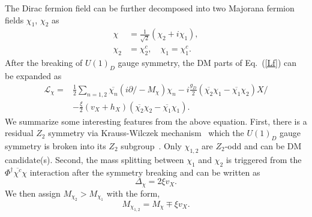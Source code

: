 \documentclass[preprint, superscriptaddress,amsmath, nofootinbib]{revtex4-1}
\begin{document}
{The Dirac fermion field can be further decomposed into two Majorana fermion fields $\chi_1$, $\chi_2$ as 
\begin{equation}
\begin{split} 
    \chi &= \frac{1}{\sqrt{2}}(\chi_2+i\chi_1), \\
    \chi_2 &= \chi^c_2,\quad \chi_1 = \chi^c_1.
\end{split}
\end{equation}
After the breaking of $U(1)_D$ gauge symmetry, the DM parts of Eq.~(\ref{Lf}) can be expanded as 
\begin{equation}
\begin{split}
    \mathcal{L}_{\chi} =& \frac{1}{2}\sum_{n=1,2}\overline{\chi_n}(i\partial \!\!\!/ -M_{\chi})\chi_n -i\frac{g_D}{2}\left(\overline{\chi_2}\chi_1 -\overline{\chi_1}\chi_2\right)X \!\!\!/  \\ 
    &-\frac{\xi}{2}(v_X+h_X)(\overline{\chi_2}\chi_2-\overline{\chi_1}\chi_1).
    \label{msat} 
\end{split}    
\end{equation}
We summarize some interesting features from the above equation. First, there is a residual $Z_2$ symmetry via Krauss-Wilczek mechanism~\cite{PhysRevLett.62.1221} which the $U(1)_D$ gauge symmetry is broken into its $Z_2$ subgroup~\cite{Baek:2014kna}. Only $\chi_{1,2}$ are $Z_2$-odd and can be DM candidate(s). Second, the mass splitting between $\chi_1$ and $\chi_2$ is triggered from the $\Phi^{\dag}\overline{\chi^c}\chi$ interaction after the symmetry breaking and can be written as 
\begin{equation}
    \Delta_\chi = 2\xi v_X.
\end{equation}
We then assign $M_{\chi_2} > M_{\chi_1}$ with the form, 
\begin{equation}
    M_{\chi_{1,2}} = M_{\chi}\mp\xi v_X.
\end{equation}


}
\end{document}
